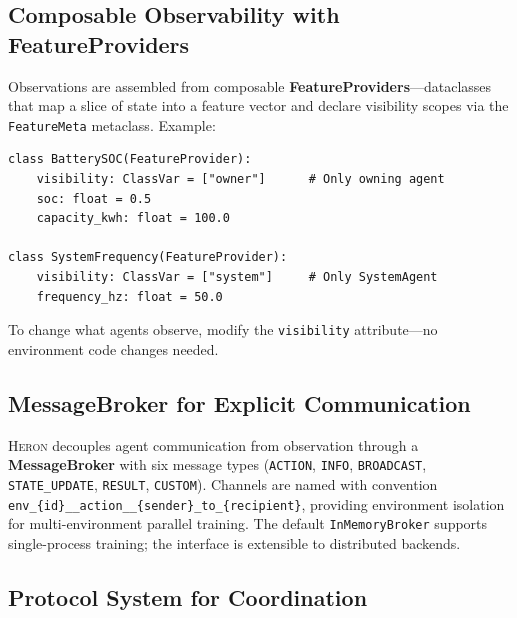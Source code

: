 \documentclass{article}
\newcommand{\heron}{\textsc{Heron}}
\begin{document}
\subsection{Composable Observability with FeatureProviders}
\label{sec:observability}

Observations are assembled from composable \textbf{FeatureProviders}---dataclasses that map a slice of state into a feature vector and declare visibility scopes via the \texttt{FeatureMeta} metaclass. Example:

\begin{lstlisting}
class BatterySOC(FeatureProvider):
    visibility: ClassVar = ["owner"]      # Only owning agent
    soc: float = 0.5
    capacity_kwh: float = 100.0

class SystemFrequency(FeatureProvider):
    visibility: ClassVar = ["system"]     # Only SystemAgent
    frequency_hz: float = 50.0
\end{lstlisting}

To change what agents observe, modify the \texttt{visibility} attribute---no environment code changes needed.

\subsection{MessageBroker for Explicit Communication}
\label{sec:messaging}

\heron{} decouples agent communication from observation through a \textbf{MessageBroker} with six message types (\texttt{ACTION}, \texttt{INFO}, \texttt{BROADCAST}, \texttt{STATE\_UPDATE}, \texttt{RESULT}, \texttt{CUSTOM}). Channels are named with convention \texttt{env\_\{id\}\_\_action\_\_\{sender\}\_to\_\{recipient\}}, providing environment isolation for multi-environment parallel training. The default \texttt{InMemoryBroker} supports single-process training; the interface is extensible to distributed backends.

\subsection{Protocol System for Coordination}
\label{sec:protocols}
\end{document}
